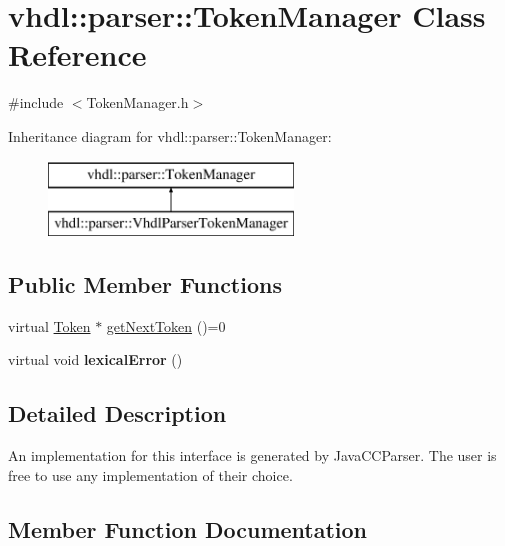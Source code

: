 \hypertarget{classvhdl_1_1parser_1_1_token_manager}{}\section{vhdl\+::parser\+::Token\+Manager Class Reference}
\label{classvhdl_1_1parser_1_1_token_manager}


{\ttfamily \#include $<$Token\+Manager.\+h$>$}

Inheritance diagram for vhdl\+::parser\+::Token\+Manager\+:\begin{figure}[H]
\begin{center}
\leavevmode
\includegraphics[height=2.000000cm]{classvhdl_1_1parser_1_1_token_manager}
\end{center}
\end{figure}
\subsection*{Public Member Functions}
\begin{DoxyCompactItemize}
\item 
virtual \mbox{\hyperlink{classvhdl_1_1parser_1_1_token}{Token}} $\ast$ \mbox{\hyperlink{classvhdl_1_1parser_1_1_token_manager_aa753c21895956639fec2bc3240356f15}{get\+Next\+Token}} ()=0
\item 
\mbox{\label{classvhdl_1_1parser_1_1_token_manager_a07c59d061a25f0349a8bd1a17b05b42b}} 
virtual void {\bfseries lexical\+Error} ()
\end{DoxyCompactItemize}


\subsection{Detailed Description}
An implementation for this interface is generated by Java\+C\+C\+Parser. The user is free to use any implementation of their choice. 

\subsection{Member Function Documentation}
\mbox{\label{classvhdl_1_1parser_1_1_token_manager_aa753c21895956639fec2bc3240356f15}} 
